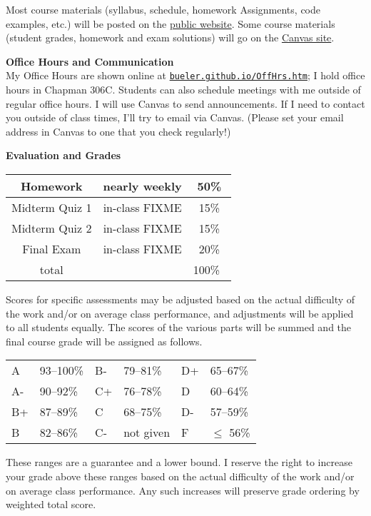 \documentclass[12pt]{article}
\renewcommand{\emph}[1]{\textsf{\textbf{#1}}}
\newcommand{\localhead}[1]{\par\smallskip\textbf{#1} \smallskip\nobreak\\}%
\def\heading#1{\localhead{\large\emph{#1}}}
\begin{document}
Most course materials (syllabus, schedule, homework Assignments, code examples, etc.) will be posted on the \href{https://bueler.github.io/nla/}{public website}.  Some course materials (student grades, homework and exam solutions) will go on the \href{https://canvas.alaska.edu/courses/27130}{Canvas site}.


\heading{Office Hours and Communication}
My Office Hours are shown online at \href{http://bueler.github.io/OffHrs.htm}{\texttt{bueler.github.io/OffHrs.htm}}; I hold office hours in Chapman 306C.  Students can also schedule meetings with me outside of regular office hours.  I will use Canvas to send announcements.  If I need to contact you outside of class times, I'll try to email via Canvas.  (Please set your email address in Canvas to one that you check regularly!)


\clearpage\newpage
\phantom{foo}
\heading{Evaluation and Grades}
\vskip -10pt

\begin{tabular}{|c|c|c|}
\hline
Homework & nearly weekly & 50\% \\
\hline
Midterm Quiz 1 & in-class FIXME  & 15\%  \\
\hline
Midterm Quiz 2 & in-class FIXME & 15\%  \\
\hline
Final Exam     & in-class FIXME & 20\% \\
\hline
total & & 100\% \, \\
\hline
\end{tabular}

Scores for specific assessments may be adjusted based on the actual difficulty of the work and/or on average class performance, and adjustments will be applied to all students equally.  The scores of the various parts will be summed and the final course grade will be assigned as follows.

\begin{tabular}{llllll}
A  & 93--100\% & B- & 79--81\%  & D+ & 65--67\%  \\
A- & 90--92\%  & C+ & 76--78\%  & D  & 60--64\%  \\
B+ & 87--89\%  & C  & 68--75\%  & D- & 57--59\%  \\
B  & 82--86\%  & C- & not given & F  & $\le$ 56\%
\end{tabular}

These ranges are a guarantee and a lower bound.  I reserve the right to increase your grade above these ranges based on the actual difficulty of the work and/or on average class performance.  Any such increases will preserve grade ordering by weighted total score.
\end{document}
